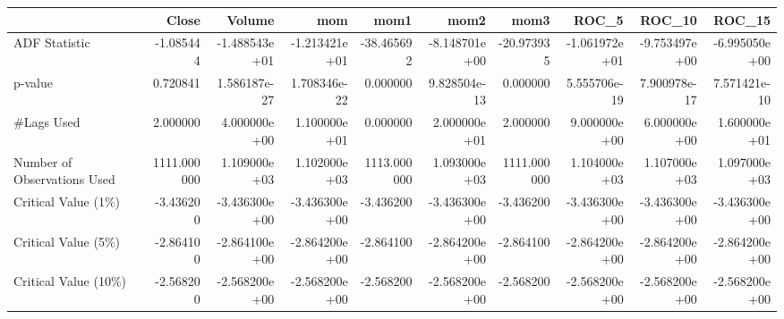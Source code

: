 \begin{tabular}{lrrrrrrrrr}
\toprule
{} &        Close &        Volume &           mom &         mom1 &          mom2 &         mom3 &         ROC\_5 &        ROC\_10 &        ROC\_15 \\
\midrule
ADF Statistic               &    -1.085444 & -1.488543e+01 & -1.213421e+01 &   -38.465692 & -8.148701e+00 &   -20.973935 & -1.061972e+01 & -9.753497e+00 & -6.995050e+00 \\
p-value                     &     0.720841 &  1.586187e-27 &  1.708346e-22 &     0.000000 &  9.828504e-13 &     0.000000 &  5.555706e-19 &  7.900978e-17 &  7.571421e-10 \\
\#Lags Used                  &     2.000000 &  4.000000e+00 &  1.100000e+01 &     0.000000 &  2.000000e+01 &     2.000000 &  9.000000e+00 &  6.000000e+00 &  1.600000e+01 \\
Number of Observations Used &  1111.000000 &  1.109000e+03 &  1.102000e+03 &  1113.000000 &  1.093000e+03 &  1111.000000 &  1.104000e+03 &  1.107000e+03 &  1.097000e+03 \\
Critical Value (1\%)         &    -3.436200 & -3.436300e+00 & -3.436300e+00 &    -3.436200 & -3.436300e+00 &    -3.436200 & -3.436300e+00 & -3.436300e+00 & -3.436300e+00 \\
Critical Value (5\%)         &    -2.864100 & -2.864100e+00 & -2.864200e+00 &    -2.864100 & -2.864200e+00 &    -2.864100 & -2.864200e+00 & -2.864200e+00 & -2.864200e+00 \\
Critical Value (10\%)        &    -2.568200 & -2.568200e+00 & -2.568200e+00 &    -2.568200 & -2.568200e+00 &    -2.568200 & -2.568200e+00 & -2.568200e+00 & -2.568200e+00 \\
\bottomrule
\end{tabular}
